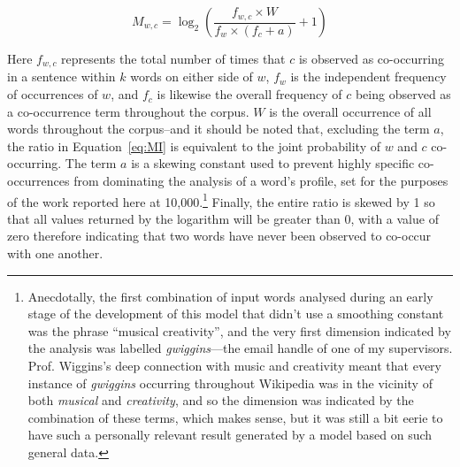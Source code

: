\begin{equation}\label{eq:MI}
M_{w,c} = \log_2 \left(\frac{f_{w,c} \times W}{f_w \times \left(f_c + a\right)} + 1\right)
\end{equation}

Here $f_{w,c}$ represents the total number of times that $c$ is observed as co-occurring in a sentence within $k$ words on either side of $w$, $f_w$ is the independent frequency of occurrences of $w$, and $f_c$ is likewise the overall frequency of $c$ being observed as a co-occurrence term throughout the corpus.  $W$ is the overall occurrence of all words throughout the corpus--and it should be noted that, excluding the term $a$, the ratio in Equation~\ref{eq:MI} is equivalent to the joint probability of $w$ and $c$ co-occurring.  The term $a$ is a skewing constant used to prevent highly specific co-occurrences from dominating the analysis of a word's profile, set for the purposes of the work reported here at 10,000.\footnote{Anecdotally, the first combination of input words analysed during an early stage of the development of this model that didn't use a smoothing constant was the phrase ``musical creativity'', and the very first dimension indicated by the analysis was labelled \emph{gwiggins}---the email handle of one of my supervisors.  Prof. Wiggins's deep connection with music and creativity meant that every instance of \emph{gwiggins} occurring throughout Wikipedia was in the vicinity of both \emph{musical} and \emph{creativity}, and so the dimension was indicated by the combination of these terms, which makes sense, but it was still a bit eerie to have such a personally relevant result generated by a model based on such general data.}  Finally, the entire ratio is skewed by 1 so that all values returned by the logarithm will be greater than 0, with a value of zero therefore indicating that two words have never been observed to co-occur with one another.

